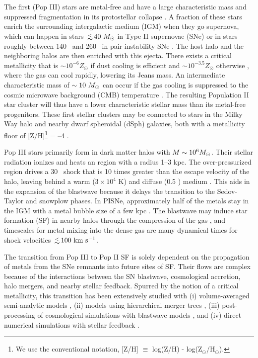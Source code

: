 \documentclass[apjl]{emulateapj}
\begin{document}
The first (Pop III) stars are metal-free and have a large
characteristic mass and suppressed fragmentation in its protostellar
collapse \citep{ABN02, Bromm02_P3, OShea07a}.  A fraction of these
stars enrich the surrounding intergalactic medium (IGM) when they go
supernova, which can happen in stars $\lsim 40~\Ms$ in Type II
supernovae (SNe) or in stars roughly between 140 \Ms~and 260 \Ms~in
pair-instability SNe \citep[PISNe;][]{2002ApJ...567..532H}.  The host
halo and the neighboring halos are then enriched with this ejecta.
There exists a critical metallicity that is $\sim 10^{-6} Z_\odot$ if
dust cooling is efficient \citep{Omukai05, Schneider06_Frag, clark08}
and $\sim 10^{-3.5} Z_\odot$ otherwise \citep{Bromm01,
  2009ApJ...691..441S}, where the gas can cool rapidly, lowering its
Jeans mass.  An intermediate characteristic mass of $\sim10~\Ms$ can
occur if the gas cooling is suppressed to the cosmic microwave
background (CMB) temperature \citep{Larson98, Tumlinson07_IMF,
  2009ApJ...691..441S}.  The resulting Population II star cluster will
thus have a lower characteristic stellar mass than its metal-free
progenitors.  These first stellar clusters may be connected to stars
in the Milky Way halo and nearby dwarf spheroidal (dSph) galaxies,
both with a metallicity floor of [Z/H]\footnote{We use the
  conventional notation, [Z/H] $\equiv$ log(Z/H) -
  log(Z$_\odot$/H$_\odot$).} = --4 \citep{Beers05, Frebel10_Obs,
  Tafelmeyer10}.

Pop III stars primarily form in dark matter halos with $M \sim 10^6
\Ms$.  Their stellar radiation ionizes and heats an  region
with a radius 1--3 kpc.  The over-pressurized  region drives
a 30 \kms~shock that is 10 times greater than the escape velocity of
the halo, leaving behind a warm ($3 \times 10^4$ K) and diffuse (0.5
\cubecm) medium \citep{Kitayama04, Whalen04, Abel07}.  This aids in
the expansion of the blastwave because it delays the transition to the
Sedov-Taylor and snowplow phases.  In PISNe, approximately half of the
metals stay in the IGM with a metal bubble size of a few kpc
\citep{Wise08_Gal, Greif10}.  The blastwave may induce star formation
(SF) in nearby halos through the compression of the gas
\citep{Ferrara98}, and timescales for metal mixing into the dense gas
are many dynamical times \citep{Cen08} for shock velocities
$\lsim100~\kms$.

The transition from Pop III to Pop II SF is solely dependent on the
propagation of metals from the SNe remnants into future sites of SF.
Their flows are complex because of the interactions between the SN
blastwave, cosmological accretion, halo mergers, and nearby stellar
feedback.  Spurred by the notion of a critical metallicity, this
transition has been extensively studied with (i) volume-averaged
semi-analytic models \citep{Scannapieco03, Yoshida04,
  Furlanetto05_Reion}, (ii) models using hierarchical merger trees
\citep{Tumlinson06, Tumlinson10, Salvadori07, Komiya10}, (iii)
post-processing of cosmological simulations with blastwave models
\citep{Karlsson08, Trenti09, Trenti10}, and (iv) direct numerical
simulations with stellar feedback \citep{Tornatore07, Ricotti08,
  Maio10_Pop32, Maio11_Enrich}.
\end{document}
